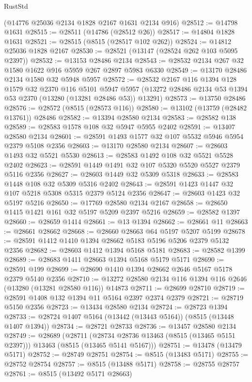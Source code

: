 \begin{lexlean}{RustStd}
\begin{coremodule}
    (@14776 @25036 @2134 @1828 @2167 @1631 @2134 @916)
@28512 := @14798 @1631
@28515 := @28511 (@14786 (@28512 @26))
@28517 := @14804 @1828 @1631
@28521 := @28515 (@8515 (@28517 @102 @262))
@28524 := @14812 @25036 @1828 @2167
@28530 := @28521 (@13147 (@28524 @262 @103 @5095 @2397))
@28532 := @13153 @28486 @2134
@28543 := @28532 @2134 @267 @32 @1580 @1622 @916 @5959 @267 @2897 @5983 @6330
@28549 := @13170 @28486 @2134 @1580 @32 @5948 @5957
@28572 := @28532
    @2167
    @116
    @1394
    @128
    @1579
    @32
    @2370
    @116
    @5101
    @5947
    @5957
    (@13272 @28486 @2134 @53 @1394 @53 @2370 (@13280 (@13281 @28486 @53)) @13291)
@28573 := @13750 @28486
@28576 := @28572 (@8515 (@28573 @116))
@28580 := @13102 (@13759 (@28482 @13761)) @28486
@28582 := @13394 @28580 @2134
@28583 := @28582 @138
@28589 := @28583 @1578 @108 @32 @5947 @5955 @2402
@28591 := @13407 @28580 @2134
@28601 := @28591 @1493 @1577 @32 @107 @5532 @5946 @5954 @2379 @5108 @2356
@28603 := @13170 @28580 @2134
@28607 := @28603 @1493 @32 @5521 @5530
@28613 := @28583 @1492 @108 @32 @5521 @5528 @2402
@28623 := @28591 @1449 @1491 @32 @107 @5320 @5520 @5527 @2379 @5116 @2356
@28627 := @28603 @1449 @32 @5309 @5318
@28633 := @28583 @1448 @108 @32 @5309 @5316 @2402
@28643 := @28591 @1423 @1447 @32 @107 @5218 @5308 @5315 @2379 @5124 @2356
@28647 := @28603 @1423 @32 @5197 @5216
@28650 := @17769 @28580 @2134 @2167
@28658 := @28650 @1415 @1421 @161 @32 @5197 @5209 @2397 @5216
@28659 := @28582 @1397
@28660 := @28659 @1414
@28661 := @13 @1394
@28662 := @28661 @11
@28663 := @28661 @28662
@28668 := @28660 @28663 @64 @5197 @5207 @5199
@28678 := @28591 @1412 @1410 @1394 @28662 @5183 @5196 @5206 @2379 @5132 @2356
@28682 := @28603 @1412 @1394 @5168 @5181
@28683 := @28582 @1399
@28689 := @28683 @1411 @28663 @1394 @5168 @5179 @5171
@28690 := @28591 @199
@28699 := @28690 @1410 @1394 @28662 @2646 @5167 @5178 @2379 @5140 @2356
@28710 := @13272 @28580 @2134 @116 @1394 @116 @2646 (@13280 (@13281 @28580 @116)) @14873
@28711 := @28699 @28710
@28719 := @28591 @1408 @132 @1394 @11 @5164 @2397 @2374 @2379
@28721 := @28719 @5150 @2356
@28723 := @13434 @28580 @2134
@28724 := @28723 @1394
@28733 := @28724 @1407 @5164 (@13442 (@13443 @5164)) (@8515 (@13448 @1407 @1394))
@28734 := @28721 @28733
@28736 := @13457 @28580 @2134
@28749 := @28689
    (@28711 (@28734 @28736 @13463 (@8515 (@13465 @5151 @2397))) @13463 (@8515 (@13465 @5141 @5167)))
@28751 := @13478 (@13479 @5171)
@28752 := @28749 @28751
@28754 := @8515 (@13483 @5171)
@28755 := @28752 @28754
@28757 := @8515 (@13488 @5171)
@28758 := @28755 @28757
@28761 := @8515 (@13492 @5171 @28663)

\end{coremodule}
\end{lexlean}
